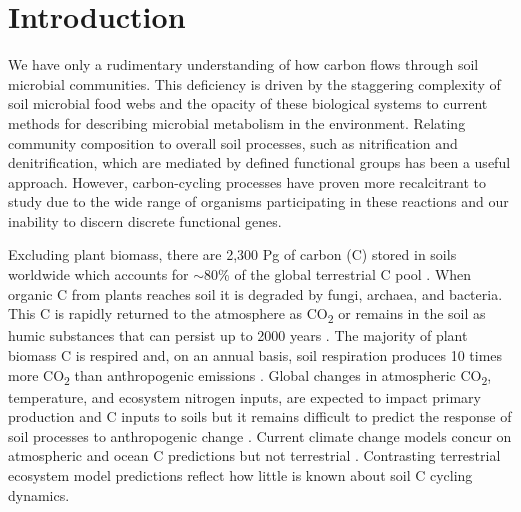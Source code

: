 \section{Introduction}
We have only a rudimentary understanding of how carbon flows through soil microbial communities. This deficiency is driven by the staggering complexity of soil microbial food webs and the opacity of these biological systems to current methods for describing microbial metabolism in the environment. Relating community composition to overall soil processes, such as nitrification and denitrification, which are mediated by defined functional groups has been a useful approach. However, carbon-cycling processes have proven more recalcitrant to study due to the wide range of organisms participating in these reactions and our inability to discern discrete functional genes.
 
Excluding plant biomass, there are 2,300 Pg of carbon (C) stored in soils worldwide which accounts for $\sim$80\% of the global terrestrial C pool \cite{Amundson_2001,Mendelsohn_2001,IPCC2007Synth,elsen_Ayres_Wall_Bardgett_2011,Lal_2008,BATJES_1996,Lal_2008}. When organic C from plants reaches soil it is degraded by fungi, archaea, and bacteria. This C is rapidly returned to the atmosphere as CO\textsubscript{2} or remains in the soil as humic substances that can persist up to 2000 years \cite{yanagita1990natural}. The majority of plant biomass C is respired and, on an annual basis, soil respiration produces 10 times more CO\textsubscript{2} than anthropogenic emissions \cite{chapin2002principles}. Global changes in atmospheric CO\textsubscript{2}, temperature, and ecosystem nitrogen inputs, are expected to impact primary production and C inputs to soils \citep{Groenigen_2006} but it remains difficult to predict the response of soil processes to anthropogenic change \cite{DAVIDSON_2006}. Current climate change models concur on atmospheric and ocean C predictions but not terrestrial \cite{Friedlingstein_2006}. Contrasting terrestrial ecosystem model predictions reflect how little is known about soil C cycling dynamics. 

